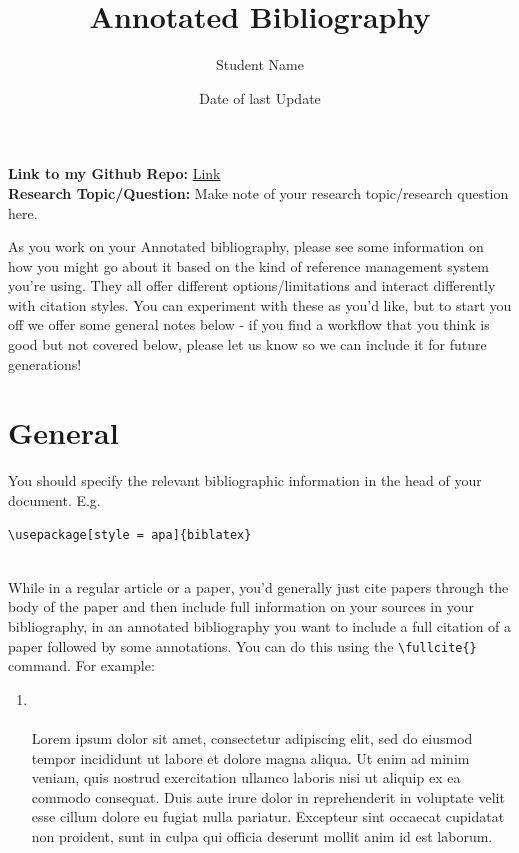 \documentclass{article}
\title{Annotated Bibliography}
\author{Student Name}
\date{Date of last Update}
\begin{document}
\maketitle


\textbf{Link to my Github Repo:} \href{Add link to your github repo here}{Link}\\
\textbf{Research Topic/Question:} Make note of your research topic/research question here.

As you work on your Annotated bibliography, please see some information on how you might go about it based on the kind of reference management system you're using. They all offer different options/limitations and interact differently with citation styles. You can experiment with these as you'd like, but to start you off we offer some general notes below - if you find a workflow that you think is good but not covered below, please let us know so we can include it for future generations!


\section*{General}

You should specify the relevant bibliographic information in the head of your document. E.g.

\begin{verbatim}
\usepackage[style = apa]{biblatex}
    
\end{verbatim}

While in a regular article or a paper, you'd generally just cite papers through the body of the paper and then include full information on your sources in your bibliography, in an annotated bibliography you want to include a full citation of a paper followed by some annotations. You can do this using the \verb|\fullcite{}| command. For example:

\begin{enumerate}
    \item  {}\\ \\ Lorem ipsum dolor sit amet, consectetur adipiscing elit, sed do eiusmod tempor incididunt ut labore et dolore magna aliqua. Ut enim ad minim veniam, quis nostrud exercitation ullamco laboris nisi ut aliquip ex ea commodo consequat. Duis aute irure dolor in reprehenderit in voluptate velit esse cillum dolore eu fugiat nulla pariatur. Excepteur sint occaecat cupidatat non proident, sunt in culpa qui officia deserunt mollit anim id est laborum.
\end{enumerate}
\end{document}
